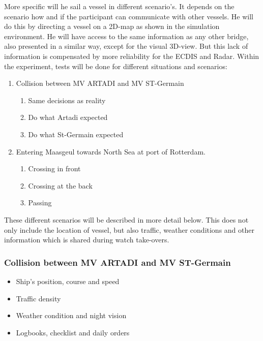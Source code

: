 More specific will he sail a vessel in different scenario's. It depends on the scenario how and if the participant can communicate with other vessels. He will do this by directing a vessel on a 2D-map as shown in the simulation environment. He will have access to the same information as any other bridge, also presented in a similar way, except for the visual 3D-view. But this lack of information is compensated by more reliability for the ECDIS and Radar.
Within the experiment, tests will be done for different situations and scenarios: 

\begin{enumerate}
	\item Collision between MV ARTADI and MV ST-Germain
	\begin{enumerate}[label=(\Alph*)]
		\item Same decisions as reality
		\item Do what Artadi expected
		\item Do what St-Germain expected
	\end{enumerate}
	\item Entering Maasgeul towards North Sea at port of Rotterdam.
	\begin{enumerate}[label=(\Alph*)]
		\item Crossing in front
		\item Crossing at the back
		\item Passing
	\end{enumerate}
\end{enumerate}

These different scenarios will be described in more detail below. This does not only include the location of vessel, but also traffic, weather conditions and other information which is shared during watch take-overs.


\subsubsection{Collision between MV ARTADI and MV ST-Germain}
\begin{itemize}
	\item Ship's position, course and speed
	\item Traffic density
	\item Weather condition and night vision
	\item Logbooks, checklist and daily orders
\end{itemize}

